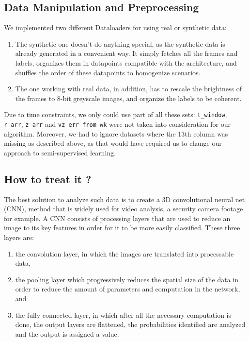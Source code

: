 \documentclass[10pt,conference]{IEEEtran}
\begin{document}
\subsection{Data Manipulation and Preprocessing}
We implemented two different Dataloaders for using real or synthetic data: 
\begin{enumerate}
  \item The synthetic one doesn't do anything special, as the synthetic data is already generated in a convenient way. It simply fetches all the frames and labels, organizes them in datapoints compatible with the architecture, and shuffles the order of these datapoints to homogenize scenarios.
  \item The one working with real data, in addition, has to rescale the brightness of the frames to 8-bit greyscale images, and organize the labels to be coherent.
\end{enumerate}
Due to time constraints, we only could use part of all these sets: \texttt{t\_window}, \texttt{r\_arr}, \texttt{z\_arr} and \texttt{vz\_err\_from\_wk} were not taken into consideration for our algorithm. Moreover, we had to ignore datasets where the 13th column was missing as described above, as that would have required us to change our approach to semi-supervised learning.

\subsection{How to treat it ?}
The best solution to analyze such data is to create a 3D convolutional neural net (CNN), method that is widely used for video analysis, a security camera footage for example. A CNN consists of processing layers that are used to reduce an image to its key features in order for it to be more easily classified. These three layers are:
\begin{enumerate}
  \item the convolution layer, in which the images are translated into processable data,
  \item the pooling layer which progressively reduces the spatial size of the data in order to reduce the amount of parameters and computation in the network, and
  \item the fully connected layer, in which after all the necessary computation is done, the output layers are flattened, the probabilities identified are analyzed and the output is assigned a value.
\end{enumerate}
\end{document}

